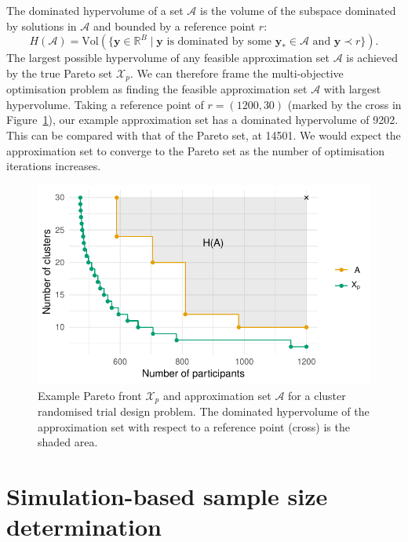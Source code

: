 \documentclass{article} %
\begin{document}
The dominated hypervolume of a set $\mathcal{A}$ is the volume of the subspace dominated by solutions in $\mathcal{A}$ and bounded by a reference point $r$:
\begin{equation}
H(\mathcal{A}) = \text{Vol}(\{\mathbf{y} \in \mathbb{R}^{B} \mid \mathbf{y} \text{ is dominated by some } \mathbf{y}_{*} \in \mathcal{A} \text{ and } \mathbf{y} \prec r \}). 
\end{equation}
The largest possible hypervolume of any feasible approximation set $\mathcal{A}$ is achieved by the true Pareto set $\mathcal{X}_{p}$. We can therefore frame the multi-objective optimisation problem as finding the feasible approximation set $\mathcal{A}$ with largest hypervolume. Taking a reference point of $r = (1200, 30)$ (marked by the cross in Figure~\ref{fig:fake_pareto}), our example approximation set has a dominated hypervolume of 9202. This can be compared with that of the Pareto set, at 14501. We would expect the approximation set to converge to the Pareto set as the number of optimisation iterations increases.

\begin{figure}
\centering
\includegraphics[scale=0.8]{./Figures/fake_pareto}
\caption{Example Pareto front $\mathcal{X}_{p}$ and approximation set $\mathcal{A}$ for a cluster randomised trial design problem. The dominated hypervolume of the approximation set with respect to a reference point (cross) is the shaded area.}
\label{fig:fake_pareto}
\end{figure}


\section{Simulation-based sample size determination}\label{sec:methods}
\end{document}
